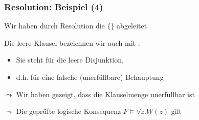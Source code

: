 \documentclass[aspectratio=1610,onlymath]{beamer}
\begin{document}
\begin{frame}\frametitle{Resolution: Beispiel (4)}

Wir haben durch Resolution die  $\{\}$ abgeleitet
\bigskip

Die leere Klausel bezeichnen wir auch mit \redalert{$\bot$}:
\begin{itemize}
\item Sie steht für die leere Disjunktion,
\item d.h. für eine falsche (unerfüllbare) Behauptung
\end{itemize}\bigskip

$\leadsto$ Wir haben gezeigt, dass die Klauselmenge unerfüllbar ist

$\leadsto$ Die geprüfte logische Konsequenz $F\models \forall z.W(z)$ gilt

\end{frame}

% 
% 
% 
% 
\end{document}
